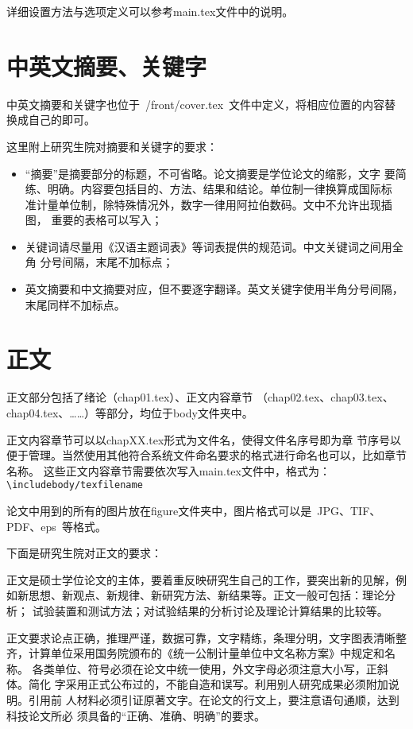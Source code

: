 详细设置方法与选项定义可以参考main.tex文件中的说明。

\section{中英文摘要、关键字}

中英文摘要和关键字也位于~{/front/cover.tex}~文件中定义，将相应位置的内容替换成自己的即可。

这里附上研究生院对摘要和关键字的要求：
\begin{itemize}
  \item “摘要”是摘要部分的标题，不可省略。论文摘要是学位论文的缩影，文字
        要简练、明确。内容要包括目的、方法、结果和结论。单位制一律换算成国际标
        准计量单位制，除特殊情况外，数字一律用阿拉伯数码。文中不允许出现插图，
        重要的表格可以写入；
  \item 关键词请尽量用《汉语主题词表》等词表提供的规范词。中文关键词之间用全角
        分号间隔，末尾不加标点；
  \item 英文摘要和中文摘要对应，但不要逐字翻译。英文关键字使用半角分号间隔，
        末尾同样不加标点。
\end{itemize}

\section{正文}

正文部分包括了绪论（chap01.tex）、正文内容章节
（chap02.tex、chap03.tex、chap04.tex、……）等部分，均位于body文件夹中。

正文内容章节可以以chapXX.tex形式为文件名，使得文件名序号即为章
节序号以便于管理。当然使用其他符合系统文件命名要求的格式进行命名也可以，比如章节名称。
这些正文内容章节需要依次写入main.tex文件中，格式为：
\texttt{\textbackslash include{body/texfilename}}

论文中用到的所有的图片放在figure文件夹中，图片格式可以是~JPG、TIF、PDF、eps~等格式。

下面是研究生院对正文的要求：

正文是硕士学位论文的主体，要着重反映研究生自己的工作，要突出新的见解，例
如新思想、新观点、新规律、新研究方法、新结果等。正文一般可包括：理论分析；
试验装置和测试方法；对试验结果的分析讨论及理论计算结果的比较等。

正文要求论点正确，推理严谨，数据可靠，文字精练，条理分明，文字图表清晰整
齐，计算单位采用国务院颁布的《统一公制计量单位中文名称方案》中规定和名称。
各类单位、符号必须在论文中统一使用，外文字母必须注意大小写，正斜体。简化
字采用正式公布过的，不能自造和误写。利用别人研究成果必须附加说明。引用前
人材料必须引证原著文字。在论文的行文上，要注意语句通顺，达到科技论文所必
须具备的“正确、准确、明确”的要求。

